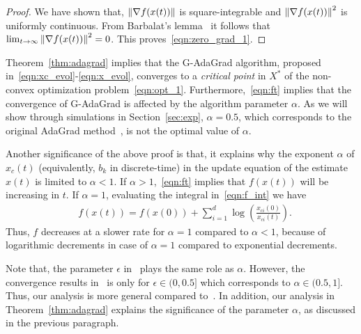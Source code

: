 \begin{proof}
We have shown that, $\left\lVert\nabla f(x(t))\right\rVert $ is square-integrable and $\left\lVert\nabla f(x(t))\right\rVert ^2$ is uniformly continuous. From Barbalat's lemma~\cite{barbalat1959systemes} it follows that $\lim_{t \to \infty} \left\lVert\nabla f(x(t))\right\rVert ^2 = 0$. This proves~\eqref{eqn:zero_grad_1}.

\end{proof}

Theorem~\ref{thm:adagrad} implies that the G-AdaGrad algorithm, proposed in~\eqref{eqn:xc_evol}-\eqref{eqn:x_evol}, converges to a {\em critical point} in $X^*$ of the non-convex optimization problem~\eqref{eqn:opt_1}. Furthermore,~\eqref{eqn:ft} implies that the convergence of G-AdaGrad is affected by the algorithm parameter $\alpha$. As we will show through simulations in Section~\ref{sec:exp}, $\alpha=0.5$, which corresponds to the original AdaGrad method~\cite{duchi2011adaptive}, is not the optimal value of $\alpha$. 

Another significance of the above proof is that, it explains why the exponent $\alpha$ of $x_c(t)$ (equivalently, $b_k$ in discrete-time) in the update equation of the estimate $x(t)$ is limited to $\alpha < 1$. If $\alpha > 1$,~\eqref{eqn:ft} implies that $f(x(t))$ will be increasing in $t$. If $\alpha = 1$, evaluating the integral in~\eqref{eqn:f_int} we have
\begin{align*}
   & f(x(t)) = f(x(0)) + \sum_{i=1}^d \log \left(\frac{x_{ci}(0)}{x_{ci}(t)}\right).
\end{align*}
Thus, $f$ decreases at a slower rate for $\alpha = 1$ compared to $\alpha < 1$, because of logarithmic decrements in case of $\alpha =1$ compared to exponential decrements.

Note that, the parameter $\epsilon$ in~\cite{li2019convergence} plays the same role as $\alpha$. However, the convergence results in~\cite{li2019convergence} is only for $\epsilon \in (0,0.5]$ which corresponds to $\alpha \in (0.5,1]$. Thus, our analysis is more general compared to~\cite{li2019convergence}. In addition, our analysis in Theorem~\ref{thm:adagrad} explains the significance of the parameter $\alpha$, as discussed in the previous paragraph.
